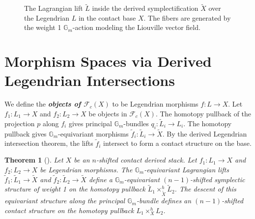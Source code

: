\documentclass[reqno]{amsart}
\newcommand{\bfem}[1]{\textbf{\textit{#1}}}
\newcommand{\Gm}{\mathbb{G}_m}
\newtheorem{theorem}{Theorem}[section]
\begin{document}
\begin{figure}[htbp]
    \centering
    \caption{The Lagrangian lift $\widetilde{L}$ inside the derived symplectification $\widetilde{X}$ over the Legendrian $L$ in the contact base $X$. The fibers are generated by the weight 1 $\Gm$-action modeling the Liouville vector field.}
\end{figure}

\section{Morphism Spaces via Derived Legendrian Intersections}\label{sec:morphisms}

We define the \bfem{objects of $\mathcal{F}_{c}(X)$} to be Legendrian morphisms $f \colon L \to X$. Let $f_1 \colon L_1 \to X$ and $f_2 \colon L_2 \to X$ be objects in $\mathcal{F}_{c}(X)$. The homotopy pullback of the projection $p$ along $f_i$ gives principal $\Gm$-bundles $q_i \colon \widetilde{L}_i \to L_i$. The homotopy pullback gives $\Gm$-equivariant morphisms $\widetilde{f}_i \colon \widetilde{L}_i \to \widetilde{X}$. By the derived Legendrian intersection theorem, the lifts $\widetilde{f}_i$ intersect to form a contact structure on the base.

\begin{theorem}[\cite{IzbudakBerktav}]\label{prev_main}
Let $X$ be an $n$-shifted contact derived stack. Let $f_1 \colon L_1 \to X$ and $f_2 \colon L_2 \to X$ be Legendrian morphisms. The $\Gm$-equivariant Lagrangian lifts $\widetilde{f}_1 \colon \widetilde{L}_1 \to \widetilde{X}$ and $\widetilde{f}_2 \colon \widetilde{L}_2 \to \widetilde{X}$ define a $\Gm$-equivariant $(n-1)$-shifted symplectic structure of weight 1 on the homotopy pullback $\widetilde{L}_1 \times_{\widetilde{X}}^h \widetilde{L}_2$. The descent of this equivariant structure along the principal $\Gm$-bundle defines an $(n-1)$-shifted contact structure on the homotopy pullback $L_1 \times_{X}^h L_2$.
\end{theorem}
\end{document}
